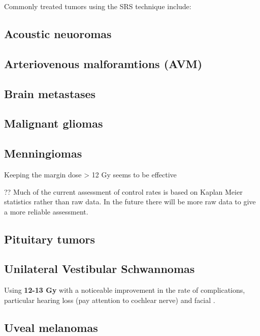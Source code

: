 \documentclass[]{book}
\theoremstyle{definition}
\theoremstyle{definition}
\theoremstyle{definition}
\theoremstyle{remark}
\begin{document}
Commonly treated tumors using the SRS technique include:

\subsection{Acoustic neuoromas}\label{acoustic-neuoromas}

\subsection{Arteriovenous malforamtions
(AVM)}\label{arteriovenous-malforamtions-avm}

\subsection{Brain metastases}\label{brain-metastases}

\subsection{Malignant gliomas}\label{malignant-gliomas}

\subsection{Menningiomas}\label{menningiomas}

Keeping the margin dose \textgreater{} 12 Gy seems to be effective

?? Much of the current assessment of control rates is based on Kaplan
Meier statistics rather than raw data. In the future there will be more
raw data to give a more reliable assessment.

\subsection{Pituitary tumors}\label{pituitary-tumors}

\subsection{Unilateral Vestibular
Schwannomas}\label{unilateral-vestibular-schwannomas}

Using \textbf{12-13 Gy} with a noticeable improvement in the rate of
complications, particular hearing loss (pay attention to cochlear nerve)
and facial .

\subsection{Uveal melanomas}\label{uveal-melanomas}
\end{document}
